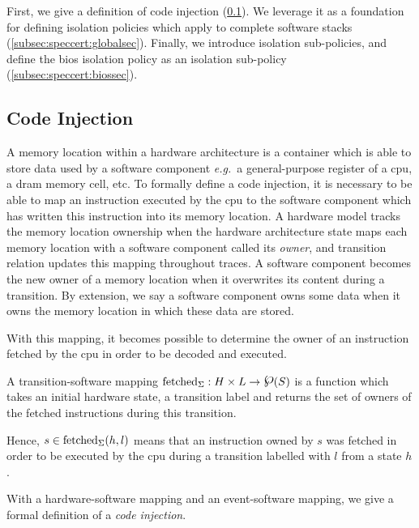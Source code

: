 First, we give a definition of code injection (\ref{subsec:speccert:tampering}).
%
We leverage it as a foundation for defining isolation policies which apply to
complete software stacks (\ref{subsec:speccert:globalsec}). 
%
Finally, we introduce isolation sub-policies, and define the \ac{bios} isolation
policy as an isolation sub-policy (\ref{subsec:speccert:biossec}).

\subsection{Code Injection}
\label{subsec:speccert:tampering}

A memory location within a hardware architecture is a container which is able to
store data used by a software component \emph{e.g.}~a general-purpose register
of a \ac{cpu}, a \ac{dram} memory cell, etc.
%
To formally define a code injection, it is necessary to be able to map an
instruction executed by the \ac{cpu} to the software component which has written
this instruction into its memory location.
%
A hardware model tracks the memory location ownership when the hardware
architecture state maps each memory location with a software component called
its \emph{owner}, and transition relation updates this mapping throughout
traces.
%
A software component becomes the new owner of a memory location when it
overwrites its content during a transition.
%
By extension, we say a software component owns some data when it owns the memory
location in which these data are stored.

With this mapping, it becomes possible to determine the owner of an instruction
fetched by the \ac{cpu} in order to be decoded and executed.

\begin{definition}
  \label{def:speccert2:transsoft}
  A transition-software mapping
  $\func{fetched}_{\Sigma}: H \times L \rightarrow \powerset(S)$ is a function
  which takes an initial hardware state, a transition label and returns the set
  of owners of the fetched instructions during this transition.
\end{definition}

Hence, $s \in \mathrm{fetched}_{\Sigma}(h, l)$ means that an instruction owned by
$s$ was fetched in order to be executed by the \ac{cpu} during a transition
labelled with $l$ from a state $h$.

With a hardware-software mapping and an event-software mapping, we give a formal
definition of a \textit{code injection}.

